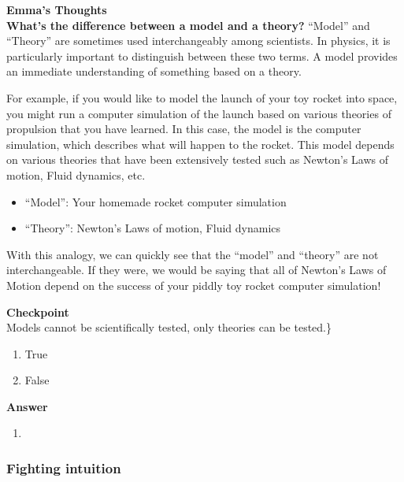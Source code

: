 \begin{framed}
\textbf{Emma's Thoughts}\\
\textbf{What's the difference between a model and a theory?}
``Model'' and ``Theory'' are sometimes used interchangeably among scientists. In physics, it is particularly important to distinguish between these two terms. A model provides an immediate understanding of something based on a theory.

For example, if you would like to model the launch of your toy rocket into space, you might run a computer simulation of the launch based on various theories of propulsion that you have learned. In this case, the model is the computer simulation, which describes what will happen to the rocket. This model depends on various theories that have been extensively tested such as Newton's Laws of motion, Fluid dynamics, etc.

\begin{itemize}
\item ``Model'': Your homemade rocket computer simulation
\item ``Theory'': Newton's Laws of motion, Fluid dynamics
\end{itemize}

With this analogy, we can quickly see that the ``model'' and ``theory'' are not interchangeable. If they were, we would be saying that all of Newton's Laws of Motion depend on the success of your piddly toy rocket computer simulation!
\end{framed}

\begin{framed}
\textbf{Checkpoint}\\
Models cannot be scientifically tested, only theories can be tested.\}

\begin{enumerate}
\item True
\item False
\end{enumerate}

\begin{framed}
\textbf{Answer}\\
\begin{enumerate}[resume]
\item
\end{enumerate}
\end{framed}
\end{framed}

\subsubsection{Fighting intuition}

